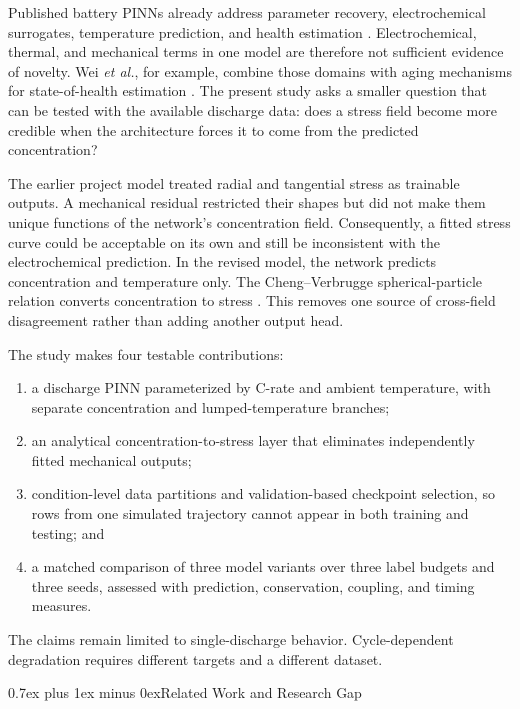 \documentclass[conference]{IEEEtran}
\makeatletter
\newcommand{\headingfont}{\rmfamily}
\def\section{\@startsection{section}{1}{\z@}{1.5ex plus 1.5ex minus 0.5ex}%
{0.7ex plus 1ex minus 0ex}{\normalfont\headingfont\large\centering\bfseries}}
\makeatother
\begin{document}
Published battery PINNs already address parameter recovery, electrochemical surrogates, temperature prediction, and health estimation \cite{hassanaly2024part1,hassanaly2024part2,wang2023temperature,wang2024parameter}. Electrochemical, thermal, and mechanical terms in one model are therefore not sufficient evidence of novelty. Wei \emph{et al.}, for example, combine those domains with aging mechanisms for state-of-health estimation \cite{wei2026etm}. The present study asks a smaller question that can be tested with the available discharge data: does a stress field become more credible when the architecture forces it to come from the predicted concentration?

The earlier project model treated radial and tangential stress as trainable outputs. A mechanical residual restricted their shapes but did not make them unique functions of the network's concentration field. Consequently, a fitted stress curve could be acceptable on its own and still be inconsistent with the electrochemical prediction. In the revised model, the network predicts concentration and temperature only. The Cheng--Verbrugge spherical-particle relation converts concentration to stress \cite{cheng2009stress}. This removes one source of cross-field disagreement rather than adding another output head.

The study makes four testable contributions:
\begin{enumerate}
    \item a discharge PINN parameterized by C-rate and ambient temperature, with separate concentration and lumped-temperature branches;
    \item an analytical concentration-to-stress layer that eliminates independently fitted mechanical outputs;
    \item condition-level data partitions and validation-based checkpoint selection, so rows from one simulated trajectory cannot appear in both training and testing; and
    \item a matched comparison of three model variants over three label budgets and three seeds, assessed with prediction, conservation, coupling, and timing measures.
\end{enumerate}
The claims remain limited to single-discharge behavior. Cycle-dependent degradation requires different targets and a different dataset.

\section{Related Work and Research Gap}
\end{document}
